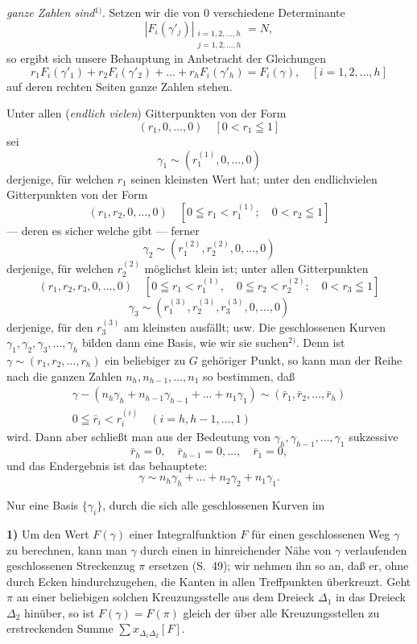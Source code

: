 \documentclass{article}
\begin{document}
\emph{ganze Zahlen sind}${}^{1)}$. Setzen wir die von $0$ verschiedene Determinante
\[ |F_i(\gamma'_j)|_{\substack{i = 1, 2, \dots, h \\ j = 1, 2, \dots, h}} = N, \]
so ergibt sich unsere Behauptung in Anbetracht der Gleichungen
\[ r_1 F_i(\gamma'_1) + r_2 F_i(\gamma'_2) + \dots + r_h F_i(\gamma'_h) = F_i(\gamma), \quad [i = 1, 2, \dots, h] \]
auf deren rechten Seiten ganze Zahlen stehen.

Unter allen (\emph{endlich vielen}) Gitterpunkten von der Form
\[ (r_1, 0, \dots, 0) \quad [0 < r_1 \leqq 1] \]
sei
\[ \gamma_1 \sim (r_1^{(1)}, 0, \dots, 0) \]
derjenige, für welchen $r_1$ seinen kleinsten Wert hat; unter den endlichvielen Gitterpunkten von der Form
\[ (r_1, r_2, 0, \dots, 0) \quad [0 \leqq r_1 < r_1^{(1)}; \quad 0 < r_2 \leqq 1] \]
--- deren es sicher welche gibt --- ferner
\[ \gamma_2 \sim (r_1^{(2)}, r_2^{(2)}, 0, \dots, 0) \]
derjenige, für welchen $r_2^{(2)}$ möglichst klein ist; unter allen Gitterpunkten
\[ (r_1, r_2, r_3, 0, \dots, 0) \quad [0 \leqq r_1 < r_1^{(1)}, \quad 0 \leqq r_2 < r_2^{(2)}; \quad 0 < r_3 \leqq 1] \]
\[ \gamma_3 \sim (r_1^{(3)}, r_2^{(3)}, r_3^{(3)}, 0, \dots, 0) \]
derjenige, für den $r_3^{(3)}$ am kleinsten ausfällt; usw. Die geschlossenen Kurven $\gamma_1, \gamma_2, \gamma_3, \dots, \gamma_h$ bilden dann eine Basis, wie wir sie suchen${}^{2)}$. Denn ist $\gamma \sim (r_1, r_2, \dots, r_h)$ ein beliebiger zu $G$ gehöriger Punkt, so kann man der Reihe nach die ganzen Zahlen $n_h, n_{h-1}, \dots, n_1$ so bestimmen, daß
\[ \begin{gathered} \gamma - (n_h \gamma_h + n_{h-1} \gamma_{h-1} + \dots + n_1 \gamma_1) \sim (\bar{r}_1, \bar{r}_2, \dots, \bar{r}_h) \\ 0 \leqq \bar{r}_i < r_i^{(i)} \quad (i = h, h - 1, \dots, 1) \end{gathered} \]
wird. Dann aber schließt man aus der Bedeutung von $\gamma_h, \gamma_{h-1}, \dots, \gamma_1$ sukzessive
\[ \bar{r}_h = 0, \quad \bar{r}_{h-1} = 0, \dots, \quad \bar{r}_1 = 0, \]
und das Endergebnis ist das behauptete:
\[ \gamma \sim n_h \gamma_h + \dots + n_2 \gamma_2 + n_1 \gamma_1. \]

Nur eine Basis $\{\gamma_i\}$, durch die sich alle geschlossenen Kurven im

\textbf{1)} Um den Wert $F(\gamma)$ einer Integralfunktion $F$ für einen geschlossenen Weg $\gamma$ zu berechnen, kann man $\gamma$ durch einen in hinreichender Nähe von $\gamma$ verlaufenden geschlossenen Streckenzug $\pi$ ersetzen (S.~49); wir nehmen ihn so an, daß er, ohne durch Ecken hindurchzugehen, die Kanten in allen Treffpunkten überkreuzt. Geht $\pi$ an einer beliebigen solchen Kreuzungsstelle aus dem Dreieck $\Delta_1$ in das Dreieck $\Delta_2$ hinüber, so ist $F(\gamma) = F(\pi)$ gleich der über alle Kreuzungsstellen zu erstreckenden Summe $\displaystyle\sum x_{\Delta_1 \Delta_2} [F]$.
\end{document}
